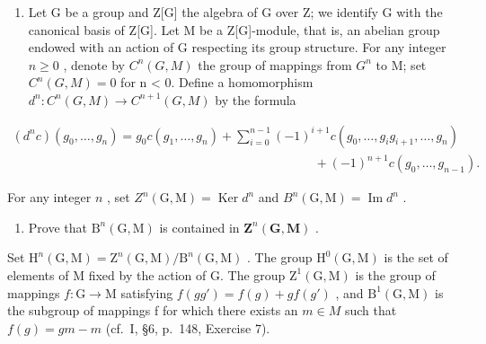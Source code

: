 
\begin{enumerate}
\def\labelenumi{\arabic{enumi})}
\tightlist
\item
  Let G be a group and Z{[}G{]} the algebra of G over Z; we identify G with the canonical basis of Z{[}G{]}. Let M be a Z{[}G{]}-module, that is, an abelian group endowed with an action of G respecting its group structure. For any integer \(n \geqslant 0\) , denote by \(C^{n}(G, M)\) the group of mappings from \(G^{n}\) to M; set \(C^{n}(G, M) = 0\) for n \textless{} 0. Define a homomorphism \(d^{n}: C^{n}(G, M) \to C^{n+1}(G, M)\) by the formula
\end{enumerate}

\[
\begin{array}{c} (d ^ {n} c) (g _ {0}, \ldots , g _ {n}) = g _ {0}   c (g _ {1}, \ldots , g _ {n}) + \sum_ {i = 0} ^ {n - 1} (- 1) ^ {i + 1} c (g _ {0}, \ldots , g _ {i} g _ {i + 1}, \ldots , g _ {n}) \\ \qquad \qquad \qquad \qquad \qquad \qquad \qquad \qquad \qquad \qquad \qquad \qquad + (- 1) ^ {n + 1} c (g _ {0}, \ldots , g _ {n - 1})  . \end{array}
\]

For any integer \(n\) , set \(Z^n(\mathrm{G},\mathrm{M}) = \operatorname{Ker} d^n\) and \(B^n(\mathrm{G},\mathrm{M}) = \operatorname{Im} d^n\) .

\begin{enumerate}
\def\labelenumi{\alph{enumi})}
\tightlist
\item
  Prove that \(\mathrm{B}^n (\mathrm{G},\mathrm{M})\) is contained in \(\mathbf{Z}^n (\mathbf{G},\mathbf{M})\) .
\end{enumerate}

Set \(\mathrm{H}^{n}(\mathrm{G},\mathrm{M})=\mathrm{Z}^{n}(\mathrm{G},\mathrm{M})/\mathrm{B}^{n}(\mathrm{G},\mathrm{M})\) . The group \(\mathrm{H}^{0}(\mathrm{G},\mathrm{M})\) is the set of elements of M fixed by the action of G. The group \(\mathrm{Z}^{1}(\mathrm{G},\mathrm{M})\) is the group of mappings \(f:\mathrm{G}\to\mathrm{M}\) satisfying \(f(gg')=f(g)+gf(g')\) , and \(\mathrm{B}^{1}(\mathrm{G},\mathrm{M})\) is the subgroup of mappings f for which there exists an \(m\in M\) such that \(f(g)=gm-m\) (cf.~I, §6, p.~148, Exercise 7).


